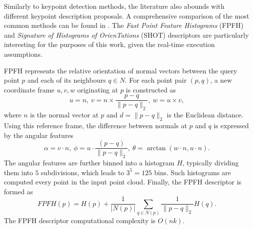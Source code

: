 

Similarly to keypoint detection methods, the literature also abounds with different keypoint description proposals. A comprehensive comparison of the most common methods can be found in \cite{descriptorsComparison}. The \textit{Fast Point Feature Histograms} (FPFH) \cite{FPFH, FPFH2} and \textit{Signature of Histograms of OrienTations} (SHOT) \cite{SHOT} descriptors are particularly interesting for the purposes of this work, given the real-time execution assumptions.


FPFH represents the relative orientation of normal vectors between the query point $p$ and each of its neighbours $q \in N$. For each point pair $(p, q)$, a new coordinate frame $u,v,w$ originating at $p$ is constructed as
\begin{equation}
u = n,\  v = n \times \frac{p-q}{\|p-q\|_2},\  w = u \times v,
\end{equation}
where $n$ is the normal vector at $p$ and $d = \|p-q\|_2$ is the Euclidean distance. Using this reference frame, the difference between normals at $p$ and $q$ is expressed by the angular features
\begin{equation}
\alpha = v \cdot n, \  \phi = u \cdot \frac{(p-q)}{\|p-q\|_2}, \ \theta = \arctan(w\cdot n, u \cdot n).
\label{eq:fpfhangulars}
\end{equation}
The angular features are further binned into a histogram $H$, typically dividing them into $5$ subdivisions, which leads to $3^5=125$ bins. Such histograms are computed every point in the input point cloud. Finally, the FPFH descriptor is formed as
\begin{equation}
FPFH(p) = H(p) + \frac{1}{|N(p)|}\sum\limits_{q\in N(p)}\frac{1}{ \|p-q\|_2}H(q).
\end{equation}
The FPFH descriptor computational complexity is $O(nk)$.


